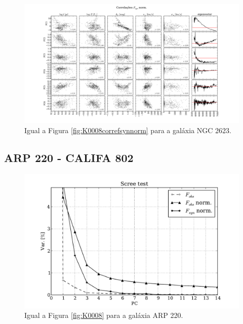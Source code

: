 \begin{figure}
    \includegraphics[width=1.3\textwidth, angle=-90]{figuras/K0213-correl-f_syn_norm-PCvsPhys.pdf}
	\caption[Correlações PCs vs. par\^ametros f\'isicos - $F_{syn}$ norm. - NGC 2623.]
	{Igual a Figura \ref{fig:K0008correfsynnorm} para a galáxia NGC 2623.}
    \label{fig:K0213correfsynnorm}
\end{figure}

\subsection{ARP 220 - CALIFA 802}

\begin{figure}
    \includegraphics[height=0.33\textheight]{figuras/K0802-screetest.pdf}
    \caption[Scree test comparativo entre 3 PCAs - ARP 220.]
	{Igual a Figura \ref{fig:K0008} para a galáxia ARP 220.}
    \label{fig:K0802scree}
\end{figure}

